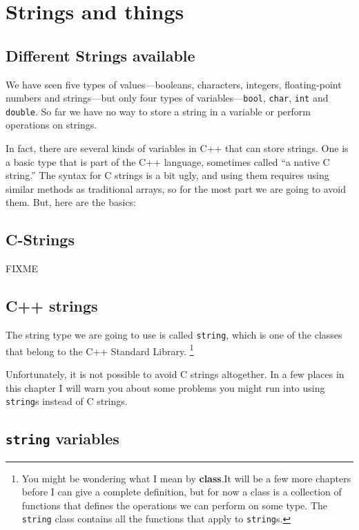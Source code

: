 


\chapter{Strings and things}
\label{strings}

\section{Different Strings available}

We have seen five types of values---booleans, characters, integers,
floating-point numbers and strings---but only four types of
variables---{\tt bool}, {\tt char}, {\tt int} and {\tt double}.  So
far we have no way to store a string in a variable or perform
operations on strings.

In fact, there are several kinds of variables in C++ that
can store strings.  One is a basic type that is part of the C++
language, sometimes called ``a native C string.''  The syntax
for C strings is a bit ugly, and using them requires using similar
methods as traditional arrays, so for the most part we are going to
avoid them. But, here are the basics:
\section{C-Strings}
FIXME
\section{C++ strings}
The string type we are going to use is called {\tt string}, which is
one of the classes that belong to the C++ Standard Library.
\footnote{You might be wondering what I mean by {\bf class}.It will be a few
more chapters before I can give a complete definition, but for now a
class is a collection of functions that defines the operations we
can perform on some type.  The {\tt string} class contains all
the functions that apply to {\tt string}s.}

Unfortunately, it is not possible to avoid C strings altogether.
In a few places in this chapter I will warn you about some problems
you might run into using {\tt string}s instead of C strings.

\section{{\tt string} variables}

